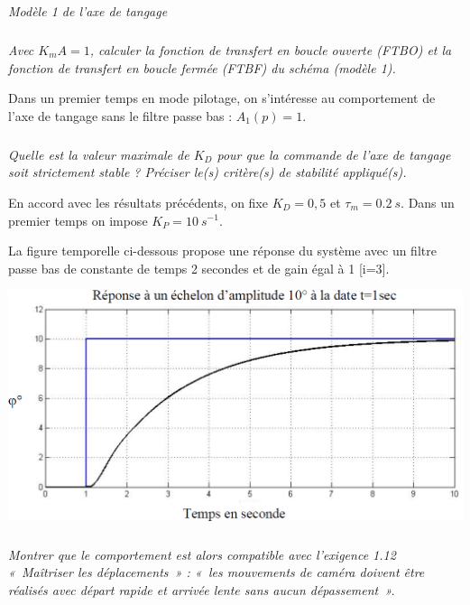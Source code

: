 \documentclass[10pt,fleqn]{article} %
\begin{document}
\begin{multicols}{2}
\begin{center}
\textit{Modèle 1 de l’axe de tangage}
\end{center}

\subparagraph{}
\textit{Avec $K_m A = 1$, calculer la fonction de transfert en boucle ouverte (FTBO) et la fonction de transfert
en boucle fermée (FTBF) du schéma (modèle 1).}
\ifprof
\begin{corrige}
\end{corrige}
\else
\fi

Dans un premier temps en mode pilotage, on s’intéresse au comportement de l’axe de tangage sans le filtre passe bas :
$A_1(p)=1$.

\subparagraph{}
\textit{Quelle est la valeur maximale de $K_D$ pour que la commande de l’axe de tangage soit strictement
stable ? Préciser le(s) critère(s) de stabilité appliqué(s).}
\ifprof
\begin{corrige}
\end{corrige}
\else
\fi

En accord avec les résultats précédents, on fixe $K_D = 0,5$ et $\tau_m = \SI{0,2}{s}$.
Dans un premier temps on impose $K_P = \SI{10}{s^{-1}}$.


La figure temporelle ci-dessous propose une réponse du système avec un filtre passe
bas de constante de temps 2 secondes et de gain égal à 1 [i=3].

\begin{center}
\includegraphics[width=\linewidth]{images/fig_02}

\end{center}


\subparagraph{}
\textit{Montrer que le comportement est alors compatible avec l’exigence 1.12 «~Maîtriser les déplacements~» :
«~les mouvements de caméra doivent être réalisés avec départ rapide et arrivée lente sans aucun dépassement~». }
\ifprof
\begin{corrige}
\end{corrige}
\else
\fi



\end{multicols}
\end{document}

